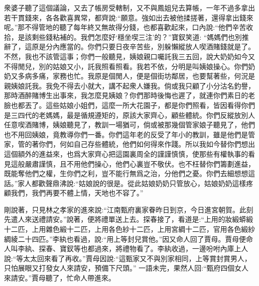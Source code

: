\begin{parag}
    衆婆子聽了這個議論，又去了帳房受轄制，又不與鳳姐兒去算帳，一年不過多拿出若干貫錢來，各各歡喜異常，都齊說:“願意。強如出去被他揉搓著，還得拿出錢來呢。”那不得管地的聽了每年終又無故得分錢，也都喜歡起來，口內說:“他們辛苦收拾，是該剩些錢粘補的。我們怎麼好‘穩坐喫三注’的？”寶釵笑道: “媽媽們也別推辭了，這原是分內應當的。你們只要日夜辛苦些，別躲懶縱放人喫酒賭錢就是了。不然，我也不該管這事；你們一般聽見，姨娘親口囑託我三五回，說大奶奶如今又不得閒兒，別的姑娘又小，託我照看照看。我若不依，分明是叫姨娘操心。你們奶奶又多病多痛，家務也忙。我原是個閒人，便是個街坊鄰居，也要幫著些，何況是親姨娘託我。我免不得去小就大，講不起衆人嫌我。倘或我只顧了小分沽名釣譽，那時酒醉賭博生出事來，我怎麼見姨娘？你們那時後悔也遲了，就連你們素日的老臉也都丟了。這些姑娘小姐們，這麼一所大花園子，都是你們照看，皆因看得你們是三四代的老媽媽，最是循規遵矩的，原該大家齊心，顧些體統。你們反縱放別人任意喫酒賭博，姨娘聽見了，教訓一場猶可，倘或被那幾個管家娘子聽見了，他們也不用回姨娘，竟教導你們一番。你們這年老的反受了年小的教訓，雖是他們是管家，管的著你們，何如自己存些體統，他們如何得來作踐。所以我如今替你們想出這個額外的進益來，也爲大家齊心把這園裏周全的謹謹慎慎，使那些有權執事的看見這般嚴肅謹慎，且不用他們操心，他們心裏豈不敬伏。也不枉替你們籌劃進益，既能奪他們之權，生你們之利，豈不能行無爲之治，分他們之憂。你們去細想想這話。”家人都歡聲鼎沸說:“姑娘說的很是。從此姑娘奶奶只管放心，姑娘奶奶這樣疼顧我們，我們再要不體上情，天地也不容了。”
\end{parag}


\begin{parag}
    剛說著，只見林之孝家的進來說:“江南甄府裏家眷昨日到京，今日進宮朝賀。此刻先遣人來送禮請安。”說著，便將禮單送上去。探春接了，看道是:“上用的妝緞蟒緞十二匹，上用雜色緞十二匹，上用各色紗十二匹，上用宮綢十二匹，官用各色緞紗綢綾二十四匹。”李紈也看過，說:“用上等封兒賞他。”因又命人回了賈母。賈母便命人叫李紈、探春、寶釵等也都過來，將禮物看了。李紈收過，一邊吩咐內庫上人說:“等太太回來看了再收。”賈母因說:“這甄家又不與別家相同，上等賞封賞男人，只怕展眼又打發女人來請安，預備下尺頭。” 一語未完，果然人回:“甄府四個女人來請安。”賈母聽了，忙命人帶進來。
\end{parag}


